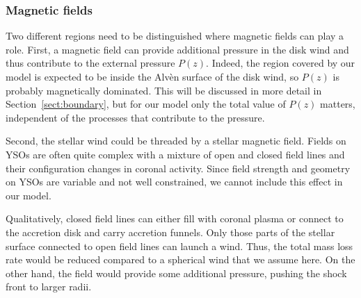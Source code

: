 \subsubsection{Magnetic fields}
Two different regions need to be distinguished where magnetic fields can play a role. First, a magnetic field can provide additional pressure in the disk wind and thus contribute to the external pressure $P(z)$. Indeed, the region covered by our model is expected to be inside the Alv\`en surface of the disk wind, so $P(z)$ is probably magnetically dominated. This will be discussed in more detail in Section~\ref{sect:boundary}, but for our model only the total value of $P(z)$ matters, independent of the processes that contribute to the pressure. 

Second, the stellar wind could be threaded by a stellar magnetic field. Fields on YSOs are often quite complex with a mixture of open and closed field lines \citep[e.g.][]{2011MNRAS.417..472D,2012MNRAS.425.2948D} and their configuration changes in coronal activity. Since field strength and geometry on YSOs are variable and not well constrained, we cannot include this effect in our model.

Qualitatively, closed field lines can either fill with coronal plasma or connect to the accretion disk and carry accretion funnels. Only those parts of the stellar surface connected to open field lines can launch a wind. Thus, the total mass loss rate would be reduced compared to a spherical wind that we assume here. On the other hand, the field would provide some additional pressure, pushing the shock front to larger radii.

